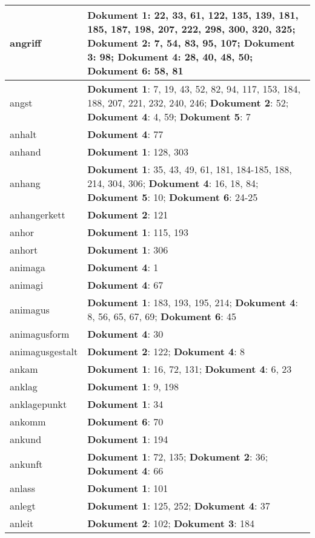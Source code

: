 \documentclass[a5paper]{article}
\begin{document}
\begin{longtable}[l]{|l|p{3in}|}
\hline
angriff & \textbf{Dokument 1}: 22, 33, 61, 122, 135, 139, 181, 185, 187, 198, 207, 222, 298, 300, 320, 325; \textbf{Dokument 2}: 7, 54, 83, 95, 107; \textbf{Dokument 3}: 98; \textbf{Dokument 4}: 28, 40, 48, 50; \textbf{Dokument 6}: 58, 81 \\
\hline
angst & \textbf{Dokument 1}: 7, 19, 43, 52, 82, 94, 117, 153, 184, 188, 207, 221, 232, 240, 246; \textbf{Dokument 2}: 52; \textbf{Dokument 4}: 4, 59; \textbf{Dokument 5}: 7 \\
\hline
anhalt & \textbf{Dokument 4}: 77 \\
\hline
anhand & \textbf{Dokument 1}: 128, 303 \\
\hline
anhang & \textbf{Dokument 1}: 35, 43, 49, 61, 181, 184-185, 188, 214, 304, 306; \textbf{Dokument 4}: 16, 18, 84; \textbf{Dokument 5}: 10; \textbf{Dokument 6}: 24-25 \\
\hline
anhangerkett & \textbf{Dokument 2}: 121 \\
\hline
anhor & \textbf{Dokument 1}: 115, 193 \\
\hline
anhort & \textbf{Dokument 1}: 306 \\
\hline
animaga & \textbf{Dokument 4}: 1 \\
\hline
animagi & \textbf{Dokument 4}: 67 \\
\hline
animagus & \textbf{Dokument 1}: 183, 193, 195, 214; \textbf{Dokument 4}: 8, 56, 65, 67, 69; \textbf{Dokument 6}: 45 \\
\hline
animagusform & \textbf{Dokument 4}: 30 \\
\hline
animagusgestalt & \textbf{Dokument 2}: 122; \textbf{Dokument 4}: 8 \\
\hline
ankam & \textbf{Dokument 1}: 16, 72, 131; \textbf{Dokument 4}: 6, 23 \\
\hline
anklag & \textbf{Dokument 1}: 9, 198 \\
\hline
anklagepunkt & \textbf{Dokument 1}: 34 \\
\hline
ankomm & \textbf{Dokument 6}: 70 \\
\hline
ankund & \textbf{Dokument 1}: 194 \\
\hline
ankunft & \textbf{Dokument 1}: 72, 135; \textbf{Dokument 2}: 36; \textbf{Dokument 4}: 66 \\
\hline
anlass & \textbf{Dokument 1}: 101 \\
\hline
anlegt & \textbf{Dokument 1}: 125, 252; \textbf{Dokument 4}: 37 \\
\hline
anleit & \textbf{Dokument 2}: 102; \textbf{Dokument 3}: 184 \\

\end{longtable}
\end{document}
